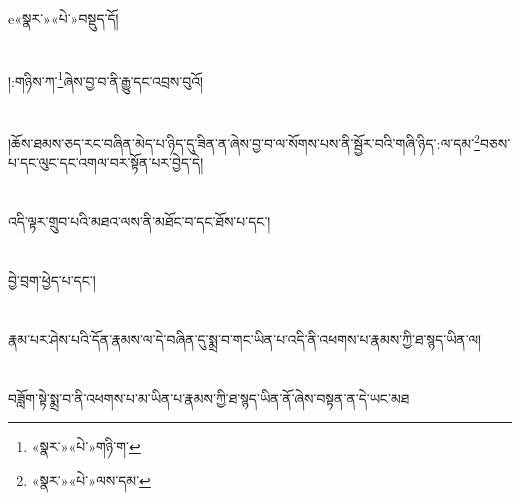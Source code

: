 e{«སྣར་»«པེ་»བསྡུད་}དོ།\chapter{ }།:གཉིས་ཀ་\footnote{«སྣར་»«པེ་»གཉི་ག་}ཞེས་བྱ་བ་ནི་རྒྱུ་དང་འབྲས་བུའོ།\chapter{ }།ཆོས་ཐམས་ཅད་རང་བཞིན་མེད་པ་ཉིད་དུ་ཟིན་ན་ཞེས་བྱ་བ་ལ་སོགས་པས་ནི་སྦྱོར་བའི་གཞི་ཉིད་:ལ་དམ་\footnote{«སྣར་»«པེ་»ལས་དམ་}བཅས་པ་དང་ལུང་དང་འགལ་བར་སྟོན་པར་བྱེད་དེ།\chapter{ }འདི་ལྟར་གྲུབ་པའི་མཐའ་ལས་ནི་མཐོང་བ་དང་ཐོས་པ་དང་།\chapter{ }བྱེ་བྲག་ཕྱེད་པ་དང་།\chapter{ }རྣམ་པར་ཤེས་པའི་དོན་རྣམས་ལ་དེ་བཞིན་དུ་སྨྲ་བ་གང་ཡིན་པ་འདི་ནི་འཕགས་པ་རྣམས་ཀྱི་ཐ་སྙད་ཡིན་ལ།\chapter{ }བཟློག་སྟེ་སྨྲ་བ་ནི་འཕགས་པ་མ་ཡིན་པ་རྣམས་ཀྱི་ཐ་སྙད་ཡིན་ནོ་ཞེས་བསྟན་ན་དེ་ཡང་མཐ